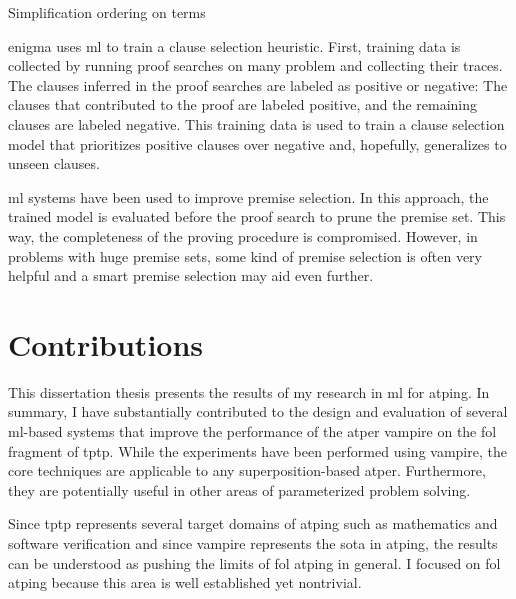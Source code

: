 Simplification ordering on terms


\Gls{enigma} uses \gls{ml} to train a clause selection heuristic.
First, training data is collected by running proof searches on many problem and collecting their traces.
The clauses inferred in the proof searches are labeled as positive or negative:
The clauses that contributed to the proof are labeled positive, and the remaining clauses are labeled negative.
This training data is used to train a clause selection model that prioritizes positive clauses over negative and, hopefully, generalizes to unseen clauses.

\Gls{ml} systems have been used to improve premise selection.
In this approach, the trained model is evaluated before the proof search to prune the premise set.
This way, the completeness of the proving procedure is compromised.
However, in problems with huge premise sets, some kind of premise selection is often very helpful and a smart premise selection may aid even further.



\chapter{Contributions}

This dissertation thesis presents the results of my research in \gls{ml} for \gls{atping}.
In summary, I have substantially contributed to the design and evaluation of several \acrshort{ml}-based systems that improve the performance of the \gls{atper} \gls{vampire} on the \gls{fol} fragment of \gls{tptp}.
While the experiments have been performed using \gls{vampire},
the core techniques are applicable to any \gls{superposition}-based \gls{atper}.
Furthermore, they are potentially useful in other areas of parameterized problem solving.

Since \gls{tptp} represents several target domains of \gls{atping}
such as mathematics and software verification
and since \gls{vampire} represents the \acrlong{sota} in \gls{atping},
the results can be understood as pushing the limits of \gls{fol} \gls{atping} in general.
I focused on \gls{fol} \gls{atping} because this area is well established yet nontrivial.

